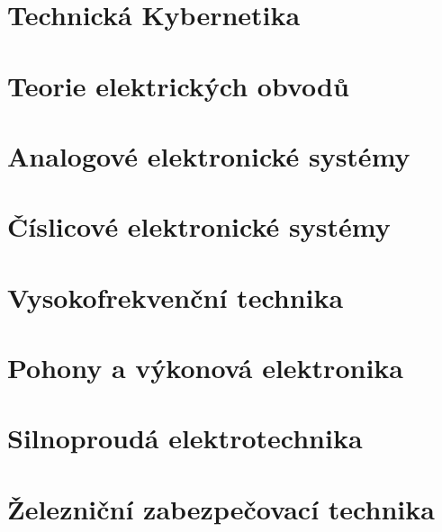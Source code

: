 \documentclass[
  fontsize=10pt,
  openany,
  chapterprefix=true]{scrbook}
\begin{document}
{
    
    
  \part{Technická Kybernetika}
    
  \part{Teorie elektrických obvodů}
    
  \part{Analogové elektronické systémy}
    
  \part{Číslicové elektronické systémy}
    
  \part{Vysokofrekvenční technika}
    
  \part{Pohony a výkonová elektronika}
    
  \part{Silnoproudá elektrotechnika}
    
  \part{Železniční zabezpečovací technika}
    
%    
}

\backmatter 
  \printbibliography[title={Bibliografie}]
\end{document}
